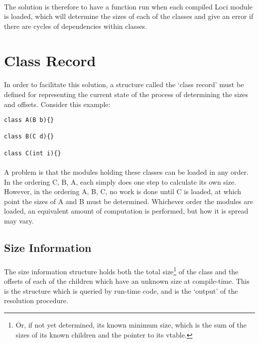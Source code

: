 \documentclass{article}
\begin{document}
\paragraph{}
The solution is therefore to have a function run when each compiled Loci module is loaded, which will determine the sizes of each of the classes and give an error if there are cycles of dependencies within classes.

\section{Class Record}

\paragraph{}
In order to facilitate this solution, a structure called the `class record' must be defined for representing the current state of the process of determining the sizes and offsets. Consider this example:

\begin{lstlisting}
class A(B b){}

class B(C d){}

class C(int i){}
\end{lstlisting}

\paragraph{}
A problem is that the modules holding these classes can be loaded in any order. In the ordering C, B, A, each simply does one step to calculate its own size. However, in the ordering A, B, C, no work is done until C is loaded, at which point the sizes of A and B must be determined. Whichever order the modules are loaded, an equivalent amount of computation is performed, but how it is spread may vary.

\subsection{Size Information}

\paragraph{}
The size information structure holds both the total size\footnote{Or, if not yet determined, its known minimum size, which is the sum of the sizes of its known children and the pointer to its vtable.} of the class and the offsets of each of the children which have an unknown size at compile-time. This is the structure which is queried by run-time code, and is the `output' of the resolution procedure.
\end{document}
